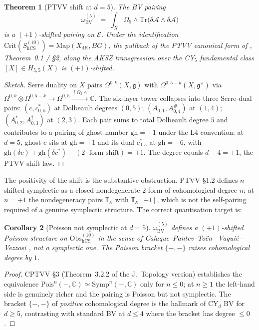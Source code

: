 \documentclass[11pt]{amsart}
\providecommand{\C}{\mathbb{C}}
\providecommand{\cA}{\mathcal{A}}
\providecommand{\cE}{\mathcal{E}}
\providecommand{\Obs}{\mathrm{Obs}}
\providecommand{\g}{\mathfrak{g}}
\providecommand{\tr}{\mathrm{Tr}}
\providecommand{\gh}{\mathrm{gh}}
\providecommand{\BV}{\mathrm{BV}}
\providecommand{\hCS}{\mathrm{hCS}}
\providecommand{\Map}{\mathrm{Map}}
\providecommand{\Crit}{\mathrm{Crit}}
\providecommand{\Pois}{\mathrm{Pois}}
\theoremstyle{plain}
\newtheorem{theorem}{Theorem}[section]
\newtheorem{corollary}[theorem]{Corollary}
\theoremstyle{definition}
\begin{document}
\begin{theorem}[PTVV shift at $d=5$]
\label{thm:plus1-shift}
The BV pairing
\[
\omega_\BV^{(5)} \;=\; \int_X \Omega_5 \wedge \tr\!\bigl(
\delta\cA \wedge \delta\cA\bigr)
\]
is a $(+1)$-shifted pairing on $\cE$. Under the identification
$\Crit(S_\hCS^{(10)}) = \Map(X_{\mathrm{dR}}, BG)$, the pullback of
the PTVV canonical form of \cite{PTVV2013}, Theorem~0.1 / §2, along
the AKSZ transgression over the CY$_5$ fundamental class
$[X] \in H_{5,5}(X)$ is $(+1)$-shifted.
\end{theorem}

\begin{proof}[Sketch]
Serre duality on $X$ pairs $\Omega^{0,k}(X,\g)$ with
$\Omega^{0,5-k}(X,\g^\vee)$ via $\Omega^{0,k} \otimes \Omega^{0,5-k}
\to \Omega^{0,5} \xrightarrow{\int \Omega_5 \wedge} \C$. The six-layer
tower collapses into three Serre-dual pairs:
$(c, c^*_{0,5})$ at Dolbeault degrees $(0,5)$;
$(A_{0,1}, A^{\#}_{0,4})$ at $(1,4)$;
$(A^*_{0,2}, A^\dagger_{0,3})$ at $(2,3)$. Each pair sums to total
Dolbeault degree $5$ and contributes to a pairing of ghost-number
$\gh = +1$ under the L4 convention: at $d=5$, ghost $c$ sits at
$\gh = +1$ and its dual $c^*_{0,5}$ at $\gh = -6$, with
$\gh(\delta c) + \gh(\delta c^*) - (2 \cdot \text{form-shift}) = +1$.
The degree equals $d - 4 = +1$, the PTVV shift law.
\end{proof}

The positivity of the shift is the substantive obstruction. PTVV §1.2
defines $n$-shifted symplectic as a closed nondegenerate $2$-form of
cohomological degree $n$; at $n = +1$ the nondegeneracy pairs
$\mathbb{T}_{\cE}$ with $\mathbb{T}_{\cE}[+1]$, which is not the
self-pairing required of a genuine symplectic structure. The correct
quantisation target is:

\begin{corollary}[Poisson not symplectic at $d=5$]
\label{cor:poisson-not-symplectic}
$\omega_\BV^{(5)}$ defines a $(+1)$-shifted \emph{Poisson} structure
on $\Obs_{\hCS}^{(10)}$ in the sense of Calaque--Pantev--To\"en--
Vaqui\'e--Vezzosi \cite{CPTVV2017}, not a symplectic one. The Poisson
bracket $\{-,-\}$ raises cohomological degree by $1$.
\end{corollary}

\begin{proof}
CPTVV §3 (Theorem~3.2.2 of the J.~Topology version) establishes the
equivalence $\Pois^{n}(-, \C) \simeq \mathrm{Symp}^{n}(-, \C)$ only
for $n \leq 0$; at $n \geq 1$ the left-hand side is genuinely richer
and the pairing is Poisson but not symplectic. The bracket
$\{-,-\}$ of \emph{positive} cohomological degree is the hallmark of
CY$_d$ BV for $d \geq 5$, contrasting with standard BV at
$d \leq 4$ where the bracket has degree $\leq 0$.
\end{proof}
\end{document}
